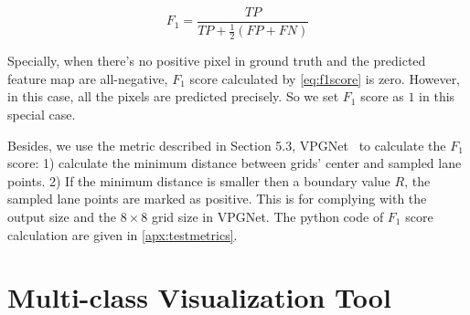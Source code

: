 \begin{spacing}{1.5}
\begin{equation}
\label{eq:f1score}
    F_1=\frac{TP}{TP+\frac{1}{2}(FP+FN)}
\end{equation}

Specially, when there's no positive pixel in ground truth and the predicted feature map are all-negative, $F_1$ score calculated by \autoref{eq:f1score} is zero. However, in this case, all the pixels are predicted precisely. So we set $F_1$ score as $1$ in this special case.

Besides, we use the metric described in Section 5.3, VPGNet~\cite{lee2017vpgnet} to calculate the $F_1$ score: 1) calculate the minimum distance between grids' center and sampled lane points. 2) If the minimum distance is smaller then a boundary value $R$, the sampled lane points are marked as positive. This is for complying with the output size and the $8 \times 8$ grid size in VPGNet. The python code of $F_1$ score calculation are given in \autoref{apx:testmetrics}.

\section{Multi-class Visualization Tool}


\end{spacing}
